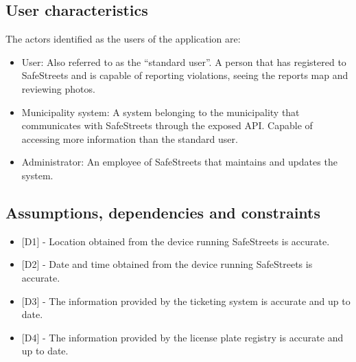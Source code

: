\subsection{User characteristics}
The actors identified as the users of the application are:
\begin{itemize}
\item
User: Also referred to as the “standard user”. A person that has registered to SafeStreets and is capable of reporting violations, seeing the reports map and reviewing photos. 
\item
Municipality system: A system belonging to the municipality that communicates with SafeStreets through the exposed API. Capable of accessing more information than the standard user.
\item
Administrator: An employee of SafeStreets that maintains and updates the system.
\end{itemize}

\subsection{Assumptions, dependencies and constraints}

\newcommand{\assumptionLocation}{
    {[D1]} - Location obtained from the device running SafeStreets is accurate.
}
\newcommand{\assumptionDateTime}{
    {[D2]} - Date and time obtained from the device running SafeStreets is accurate. 
}
\newcommand{\assumptionTicketingInfo}{
    {[D3]} - The information provided by the ticketing system is accurate and up to date. 
}
\newcommand{\assumptionLicensePlateRegistry}{
    {[D4]} - The information provided by the license plate registry is accurate and up to date.
}

\begin{itemize}[label={}]
    \item \assumptionLocation{}
    \item \assumptionDateTime{}
    \item \assumptionTicketingInfo{}
    \item \assumptionLicensePlateRegistry{}
\end{itemize}